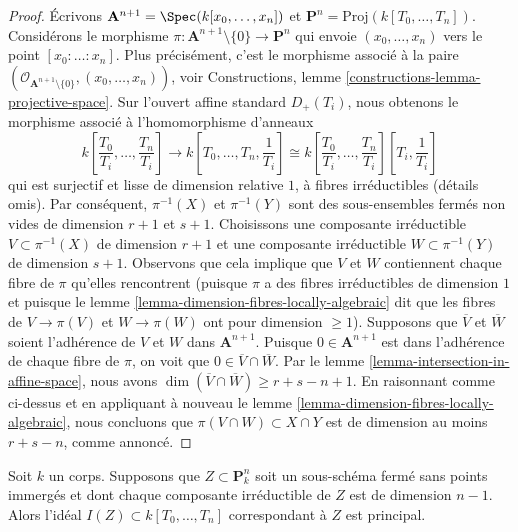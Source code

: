 \begin{proof}
Écrivons $\mathbf{A}^{n + 1} = \Spec(k[x_0, \ldots, x_n])$ et
$\mathbf{P}^n = \text{Proj}(k[T_0, \ldots, T_n])$.
Considérons le morphisme $\pi : \mathbf{A}^{n + 1}
\setminus \{0\} \to \mathbf{P}^n$ qui envoie $(x_0,
\ldots, x_n)$ vers le point $[x_0 : \ldots : x_n]$. Plus
précisément, c'est le morphisme associé à la paire
$(\mathcal{O}_{\mathbf{A}^{n + 1} \setminus \{0\}}, (x_0,
\ldots, x_n))$, voir Constructions, lemme
\ref{constructions-lemma-projective-space}. Sur l'ouvert affine standard
$D_+(T_i)$, nous obtenons le morphisme associé à l'homomorphisme d'anneaux
$$
k\left[\frac{T_0}{T_i}, \ldots, \frac{T_n}{T_i}\right]
\longrightarrow
k\left[T_0, \ldots, T_n, \frac{1}{T_i}\right] \cong
k\left[\frac{T_0}{T_i}, \ldots, \frac{T_n}{T_i}\right]
\left[T_i, \frac{1}{T_i}\right]
$$
qui est surjectif et lisse de dimension relative $1$, à fibres
irréductibles (détails omis). Par conséquent, $\pi^{-1}(X)$
et $\pi^{-1}(Y)$ sont des sous-ensembles fermés non vides de
dimension $r + 1$ et $s + 1$. Choisissons une composante
irréductible $V \subset \pi^{-1}(X)$ de dimension $r + 1$ et une
composante irréductible $W \subset \pi^{-1}(Y)$ de dimension $s + 1$.
Observons que cela implique que $V$ et $W$ contiennent chaque fibre
de $\pi$ qu'elles rencontrent (puisque $\pi$ a des fibres
irréductibles de dimension $1$ et puisque le lemme
\ref{lemma-dimension-fibres-locally-algebraic} dit que les fibres de $V
\to \pi(V)$ et $W \to \pi(W)$ ont pour dimension $\geq 1$). Supposons
que $\overline{V}$ et $\overline{W}$ soient l'adhérence de $V$ et $W$
dans $\mathbf{A}^{n + 1}$. Puisque $0 \in \mathbf{A}^{n + 1}$ est dans
l'adhérence de chaque fibre de $\pi$, on voit que $0 \in
\overline{V} \cap \overline{W}$. Par le lemme
\ref{lemma-intersection-in-affine-space}, nous avons $\dim(\overline{V} \cap
\overline{W}) \geq r + s - n + 1$. En raisonnant comme ci-dessus et en appliquant à
nouveau le lemme \ref{lemma-dimension-fibres-locally-algebraic}, nous concluons que
$\pi(V \cap W) \subset X \cap Y$ est de dimension au moins $r + s - n$, comme annoncé.
\end{proof}

\begin{lemma}
\label{lemma-equation-codim-1-in-projective-space}
Soit $k$ un corps. Supposons que $Z \subset
\mathbf{P}^n_k$ soit un sous-schéma fermé sans points immergés
et dont chaque composante irréductible de $Z$ est de dimension $n - 1$. Alors
l'idéal $I(Z) \subset k[T_0, \ldots, T_n]$ correspondant à $Z$ est principal.
\end{lemma}

